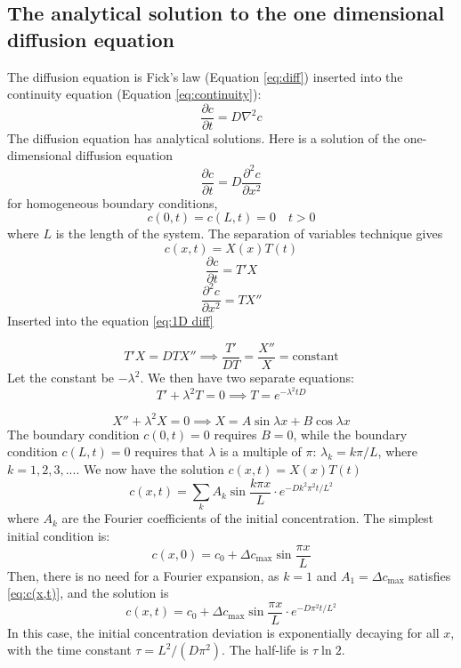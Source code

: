\documentclass{uiophd}
\begin{document}
\subsection{The analytical solution to the one dimensional diffusion equation}\label{analytical solution}
The diffusion equation is Fick's law (Equation \ref{eq:diff}) inserted into the continuity equation (Equation \ref{eq:continuity}): 
\begin{equation}
\frac{\partial c}{\partial t} = D\nabla^2 c
\end{equation}
The diffusion equation has analytical solutions. Here is a solution of the one-dimensional diffusion equation 
\begin{equation}\label{eq:1D diff}
\frac{\partial c}{\partial t} = D\frac{\partial^2 c}{\partial x^2}
\end{equation}
for homogeneous boundary conditions, 
$$c(0,t) = c(L,t)=0 \quad t>0$$ where $L$ is the length of the system. The separation of variables technique gives 
\begin{equation*}
c(x,t) = X(x)T(t)
\end{equation*}
\begin{equation*}
\frac{\partial c}{\partial t} = T'X
\end{equation*}
\begin{equation*}
\frac{\partial^2 c}{\partial x^2} = TX''
\end{equation*}
Inserted into the equation \ref{eq:1D diff}

\begin{equation*}
T'X  = DTX''\implies \frac{T'}{DT} = \frac{X''}{X} =\text{constant}
\end{equation*}
Let the constant be $-\lambda ^2$. We then have two separate equations:
\begin{equation*}
T' + \lambda^2 T = 0 \implies T=e^{-\lambda^2 tD}
\end{equation*}

\begin{equation*}
X'' + \lambda^2X = 0 \implies X=A \sin \lambda x + B\cos \lambda x
\end{equation*}
The boundary condition $c(0,t) = 0$ requires $B=0$, while the boundary condition $c(L,t)=0$ requires that $\lambda$ is a multiple of $\pi$: $\lambda_k = k\pi /L$, where $k = 1,2,3,...$. 
We now have the solution $c(x,t)=X(x)T(t)$
\begin{equation}\label{eq:c(x,t)}
c(x,t) = \sum_k A_k \sin \frac{k \pi x}{L}\cdot e^{-Dk^2\pi^2 t /L^2}
\end{equation}
where $A_k$ are the Fourier coefficients of the initial concentration.
The simplest initial condition is: 
$$c(x,0) =c_0 +  \Delta c_{\text{max}}\sin{\frac{\pi x}{L}}$$
Then, there is no need for a Fourier expansion, as $k=1$ and $A_1 = \Delta c_{\text{max}}$ satisfies \ref{eq:c(x,t)}, and the solution is
\begin{equation}\label{eq:c(x,t)analyticl}
c(x,t) =c_0 + \Delta c_{\text{max}} \sin \frac{ \pi x}{L}\cdot e^{-D\pi^2 t /L^2}
\end{equation}
In this case, the initial concentration deviation is exponentially  decaying for all $x$, with the time constant $\tau = L^2/(D\pi^2)$. The half-life is $\tau \ln 2$.
\end{document}
